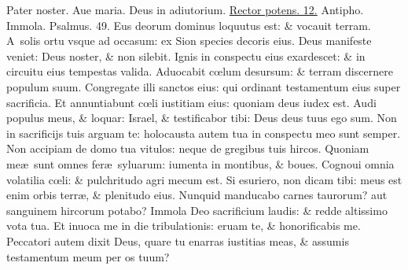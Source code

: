 \documentclass[a5paper,10pt]{book}
\def\ae{æ}
\def\oe{œ}
\begin{document}
\begin{multicols*}{2}
\par \noindent \color{red} P\color{black}ater noster. Aue maria. Deus in adiutorium. \hyperlink{Rectorpo}{Rector potens. 12.} \color{red} Antipho. \color{black} Immola. \color{red} Psalmus. \hypertarget{ps49}{49.} \color{black}
Eus deorum dominus loquutus est: \& vocauit terram.
\newline \color{red} A\color{black}\ solis ortu vsque ad occasum: ex Sion species decoris eius.
\newline \color{red} D\color{black}eus manifeste veniet: Deus noster, \& non silebit.
\newline \color{red} I\color{black}gnis in conspectu eius exardescet: \& in circuitu eius tempestas valida.
\newline \color{red} A\color{black}duocabit c\oe lum desursum: \& terram discernere populum suum.
\newline \color{red} C\color{black}ongregate illi sanctos eius: qui ordinant testamentum eius super sacrificia.
\newline \color{red} E\color{black}t annuntiabunt c\oe li iustitiam eius: quoniam deus iudex est.
\newline \color{red} A\color{black}udi populus meus, \& loquar: Israel, \& testificabor tibi: Deus deus tuus ego sum.
\newline \color{red} N\color{black}on in sacrificijs tuis arguam te: holocausta autem tua in conspectu meo sunt semper.
\newline \color{red} N\color{black}on accipiam de domo tua vitulos: neque de gregibus tuis hircos.
\newline \color{red} Q\color{black}uoniam me\ae \ sunt omnes fer\ae \ syluarum: iumenta in montibus, \& boues.
\newline \color{red} C\color{black}ognoui omnia volatilia c\oe li: \& pulchritudo agri mecum est.
\newline \color{red} S\color{black}i esuriero, non dicam tibi: meus est enim orbis terr\ae , \& plenitudo eius.
\newline \color{red} N\color{black}unquid manducabo carnes taurorum? aut sanguinem hircorum potabo?
\newline \color{red} I\color{black}mmola Deo sacrificium laudis: \& redde altissimo vota tua.
\newline \color{red} E\color{black}t inuoca me in die tribulationis: eruam te, \& honorificabis me.
\newline \color{red} P\color{black}eccatori autem dixit Deus, quare tu enarras iustitias meas, \& assumis testamentum meum per os tuum?

\end{multicols*}
\end{document}
